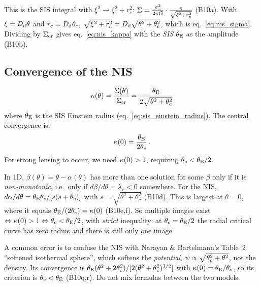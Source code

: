 \begin{derivation}
This is the SIS integral with $\xi^2\to\xi^2+r_c^2$:
$\Sigma = \frac{\sigma_v^2}{2\pi G}\cdot\frac{\pi}{\sqrt{\xi^2+r_c^2}}$ (B10a).  With
$\xi = D_{\mathrm{d}}\theta$ and $r_c = D_{\mathrm{d}}\theta_c$,
$\sqrt{\xi^2+r_c^2} = D_{\mathrm{d}}\sqrt{\theta^2+\theta_c^2}$, which is
eq.~\eqref{eq:nis_sigma}.  Dividing by $\Sigma_{\mathrm{cr}}$ gives
eq.~\eqref{eq:nis_kappa} with the \emph{SIS} $\theta_{\mathrm{E}}$ as the amplitude (B10b).
\end{derivation}

\subsection{Convergence of the NIS}

\begin{equation}
    \kappa(\theta) = \frac{\Sigma(\theta)}{\Sigma_{\mathrm{cr}}}
    = \frac{\theta_{\mathrm{E}}}{2\sqrt{\theta^2 + \theta_c^2}}
    \label{eq:nis_kappa}
\end{equation}
where $\theta_{\mathrm{E}}$ is the SIS Einstein radius (eq.~\ref{eq:sis_einstein_radius}).
The central convergence is:
\begin{equation}
    \kappa(0) = \frac{\theta_{\mathrm{E}}}{2\theta_c} \,.
    \label{eq:nis_kappa_central}
\end{equation}
For strong lensing to occur, we need $\kappa(0) > 1$, requiring
$\theta_c < \theta_{\mathrm{E}} / 2$.

\begin{annotation}
In 1D, $\beta(\theta) = \theta-\alpha(\theta)$ has more than one solution for
some $\beta$ only if it is \emph{non-monotonic}, i.e.\ only if
$d\beta/d\theta = \lambda_r<0$ somewhere.  For the NIS,
$d\alpha/d\theta = \theta_{\mathrm{E}}\theta_c/[s(s+\theta_c)]$ with $s = \sqrt{\theta^2+\theta_c^2}$
(B10d).  This is largest at $\theta = 0$, where it equals
$\theta_{\mathrm{E}}/(2\theta_c) = \kappa(0)$ (B10e,f).  So multiple images exist
$\Leftrightarrow\kappa(0)>1\Leftrightarrow\theta_c<\theta_{\mathrm{E}}/2$, with
\emph{strict} inequality: at $\theta_c = \theta_{\mathrm{E}}/2$ the radial critical curve
has zero radius and there is still only one image.

A common error is to confuse the NIS with Narayan \& Bartelmann's Table~2
``softened isothermal sphere'', which softens the \emph{potential},
$\psi\propto\sqrt{\theta_c^2+\theta^2}$, not the density.  Its convergence is
$\theta_{\mathrm{E}}(\theta^2+2\theta_c^2)/[2(\theta^2+\theta_c^2)^{3/2}]$ with
$\kappa(0) = \theta_{\mathrm{E}}/\theta_c$, so its criterion is $\theta_c<\theta_{\mathrm{E}}$
(B10q,r).  Do not mix formulas between the two models.
\end{annotation}

